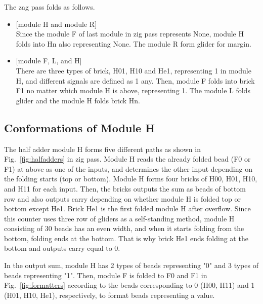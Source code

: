 \documentclass[runningheads]{llncs}
\begin{document}
The zag pass folds as follows.
\begin{itemize}
\item{[module H and module R]} \\Since the module F of last module in zig pass represents None,
module H folds into Hn also representing None. The module R form glider for margin.
\item{[module F, L, and H]} \\There are three types of brick, H01, H10 and He1, representing 1 in module H, and different signals are defined as 1 any. Then, module F folds into brick F1 no matter which module H is above, representing 1. The module L folds glider and the module H folds brick Hn.

\end{itemize}



\subsection{Conformations of Module H}
The half adder module H forms five different paths as shown in Fig.~\ref{fig:halfadders} in zig pass.
Module H reads the already folded bead (F0 or F1) at above as one of the inputs, and determines the other input depending on the folding starts (top or bottom).
Module H forms four bricks of H00, H01, H10, and H11 for each input.
Then, the bricks outputs the sum as beads of bottom row and also outputs carry depending on whether module H is folded top or bottom except He1.
Brick He1 is the first folded module H after overflow.
Since this counter uses three row of gliders as a self-standing method, module H consisting of 30 beads has an even width, and when it starts folding from the bottom, folding ends at the bottom.
That is why brick He1 ends folding at the bottom and outputs carry equal to 0.

In the output sum, module H has 2 types of beads representing "0" and  3 types of beads representing "1".
Then, module F is folded to F0 and F1 in Fig.~\ref{fig:formatters} according to the beads corresponding to 0 (H00, H11) and 1 (H01, H10, He1), respectively, to format beads representing a value.
\end{document}
